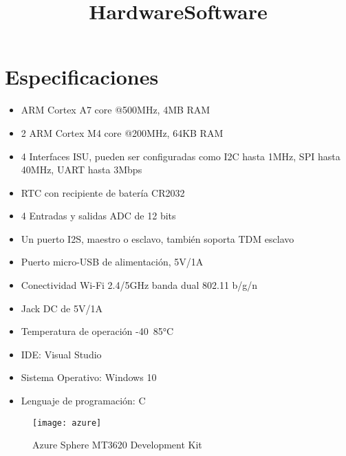 \section{Especificaciones}
\title{Hardware}
\begin{itemize}
	\item
	ARM Cortex A7 core @500MHz, 4MB RAM
	\item
	2 ARM Cortex M4 core @200MHz, 64KB RAM
	\item
	4 Interfaces ISU, pueden ser configuradas como I2C hasta 1MHz, SPI hasta 40MHz, UART hasta 3Mbps
	\item
	RTC con recipiente de batería CR2032
	\item
	4 Entradas y salidas ADC de 12 bits
	\item
	Un puerto I2S, maestro o esclavo, también soporta TDM esclavo
	\item
	Puerto micro-USB de alimentación, 5V/1A
	\item
	Conectividad Wi-Fi 2.4/5GHz banda dual 802.11 b/g/n
	\item
	Jack DC de 5V/1A
	\item
	Temperatura de operación -40~85°C
\end{itemize}	
\title{Software}
\begin{itemize}
	\item 
	IDE: Visual Studio
	\item
	Sistema Operativo: Windows 10
	\item 
	Lenguaje de programación: C
\end{itemize}
\begin{figure}[h]
	\centering
	\texttt{[image: azure]}
	\caption{Azure Sphere MT3620 Development Kit}
\end{figure}